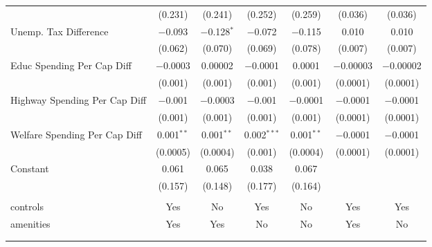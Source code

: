 \begin{table}[!htbp]
\begin{tabular}{@{\extracolsep{5pt}}lcccccc}
  & (0.231) & (0.241) & (0.252) & (0.259) & (0.036) & (0.036) \\ 
  Unemp. Tax Difference & $-$0.093 & $-$0.128$^{*}$ & $-$0.072 & $-$0.115 & 0.010 & 0.010 \\ 
  & (0.062) & (0.070) & (0.069) & (0.078) & (0.007) & (0.007) \\ 
  Educ Spending Per Cap Diff & $-$0.0003 & 0.00002 & $-$0.0001 & 0.0001 & $-$0.00003 & $-$0.00002 \\ 
  & (0.001) & (0.001) & (0.001) & (0.001) & (0.0001) & (0.0001) \\ 
  Highway Spending Per Cap Diff & $-$0.001 & $-$0.0003 & $-$0.001 & $-$0.0001 & $-$0.0001 & $-$0.0001 \\ 
  & (0.001) & (0.001) & (0.001) & (0.001) & (0.0001) & (0.0001) \\ 
  Welfare Spending Per Cap Diff & 0.001$^{**}$ & 0.001$^{**}$ & 0.002$^{***}$ & 0.001$^{**}$ & $-$0.0001 & $-$0.0001 \\ 
  & (0.0005) & (0.0004) & (0.001) & (0.0004) & (0.0001) & (0.0001) \\ 
  Constant & 0.061 & 0.065 & 0.038 & 0.067 &  &  \\ 
  & (0.157) & (0.148) & (0.177) & (0.164) &  &  \\ 
 \hline \\[-1.8ex] 
controls & Yes & No & Yes & No & Yes & Yes \\ 
amenities & Yes & Yes & No & No & Yes & No \\ 
\hline \\[-1.8ex] 
\hline 
\hline \\[-1.8ex] 
\end{tabular} 
\end{table} 
